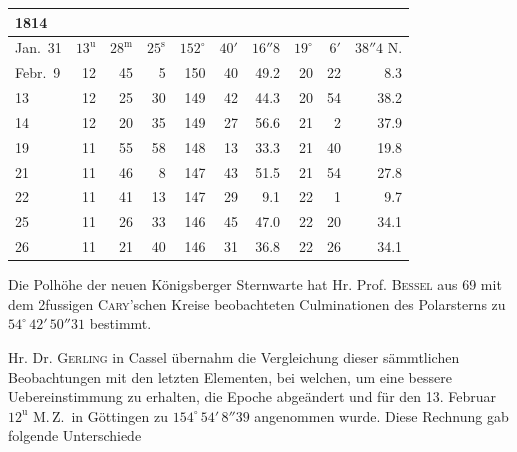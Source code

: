 \begin{center}\fontsize{9}{11}\selectfont\setlength{\tabcolsep}{3pt}\renewcommand{\arraystretch}{1.15}\begin{tabular}{l|rrr|rrr|rrr}
1814 &  &  &  \\
\hline
Jan.\ 31  & $13^{\mathrm u}$ & $28^{\mathrm m}$ & $25^{\mathrm s}$ & $152^{\circ}$ & $40'$ & $16''8$ & $19^{\circ}$ & $6'$  & $38''4$ N. \\
Febr.\ 9  & 12 & 45 & 5  & 150 & 40 & 49.2 & 20 & 22 & 8.3 \\
13        & 12 & 25 & 30 & 149 & 42 & 44.3 & 20 & 54 & 38.2 \\
14        & 12 & 20 & 35 & 149 & 27 & 56.6 & 21 & 2  & 37.9 \\
19        & 11 & 55 & 58 & 148 & 13 & 33.3 & 21 & 40 & 19.8 \\
21        & 11 & 46 & 8  & 147 & 43 & 51.5 & 21 & 54 & 27.8 \\
22        & 11 & 41 & 13 & 147 & 29 & 9.1  & 22 & 1  & 9.7  \\
25        & 11 & 26 & 33 & 146 & 45 & 47.0 & 22 & 20 & 34.1 \\
26        & 11 & 21 & 40 & 146 & 31 & 36.8 & 22 & 26 & 34.1 \\
\end{tabular}\end{center}

\par\indent Die Polhöhe der neuen Königsberger Sternwarte hat Hr. Prof. \textsc{Bessel} aus 69 mit dem
2fussigen \textsc{Cary}'schen Kreise beobachteten Culminationen des Polarsterns zu
$54^{\circ}\,42'\,50''31$ bestimmt.

\par\indent Hr. Dr. \textsc{Gerling} in Cassel übernahm die Vergleichung dieser sämmtlichen Beobachtungen
mit den letzten Elementen, bei welchen, um eine bessere Uebereinstimmung zu erhalten, die
Epoche abgeändert und für den 13. Februar $12^{\mathrm u}$ M.\,Z.\ in Göttingen zu
$154^{\circ}\,54'\,8''39$ angenommen wurde. Diese Rechnung gab folgende Unterschiede

